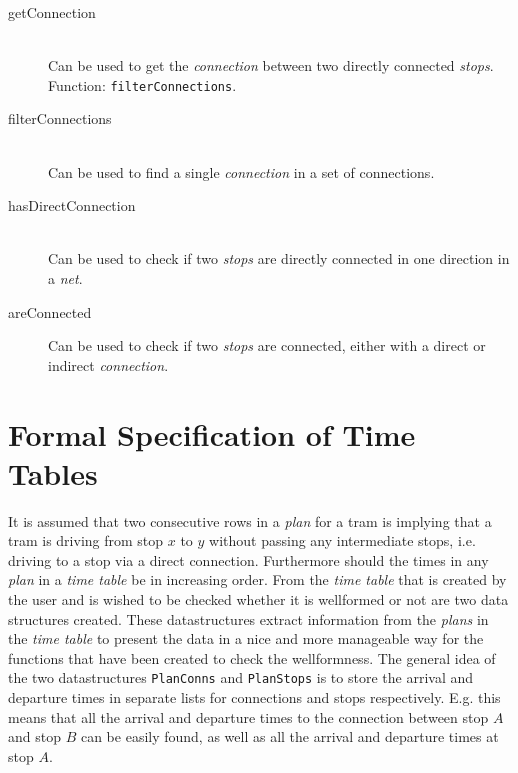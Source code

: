 \documentclass[a4]{article}
\begin{document}
\begin{description}
    \item[getConnection] \hfill \\ Can be used to get the \emph{connection} between two directly connected \emph{stops}. Function: \verb=filterConnections=.
    \item[filterConnections] \hfill \\ Can be used to find a single \emph{connection} in a set of connections.
    \item[hasDirectConnection] \hfill \\ Can be used to check if two \emph{stops} are directly connected in one direction in a \emph{net}.
    \item[areConnected] Can be used to check if two \emph{stops} are connected, either with a direct or indirect \emph{connection}.
\end{description}  

\section{Formal Specification of Time Tables}



\noindent It is assumed that two consecutive rows in a \emph{plan} for a tram is implying that a tram is driving from stop $x$ to $y$ without passing any intermediate stops, i.e. driving to a stop via a direct connection. Furthermore should the times in any \emph{plan} in a \emph{time table} be in increasing order.
From the \emph{time table} that is created by the user and is wished to be checked whether it is wellformed or not are two data structures created. These datastructures extract information from the \emph{plans} in the \emph{time table} to present the data in a nice and more manageable way for the functions that have been created to check the wellformness. The general idea of the two datastructures \verb=PlanConns= and \verb=PlanStops= is to store the arrival and departure times in separate lists for connections and stops respectively. E.g. this means that all the arrival and departure times to the connection between stop $A$ and stop $B$ can be easily found, as well as all the arrival and departure times at stop $A$.
\\
\end{document}
